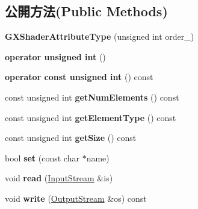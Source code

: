 \subsection*{公開方法(Public Methods)}
\begin{DoxyCompactItemize}
\item 
{\bfseries G\+X\+Shader\+Attribute\+Type} (unsigned int order\+\_)\hypertarget{class_magnum_1_1_g_x_shader_attribute_type_a07b589f091a5e39983f686599959d6cb}{}\label{class_magnum_1_1_g_x_shader_attribute_type_a07b589f091a5e39983f686599959d6cb}

\item 
{\bfseries operator unsigned int} ()\hypertarget{class_magnum_1_1_g_x_shader_attribute_type_a21c1ab8a9d49552ac5db1a88601b0b59}{}\label{class_magnum_1_1_g_x_shader_attribute_type_a21c1ab8a9d49552ac5db1a88601b0b59}

\item 
{\bfseries operator const unsigned int} () const \hypertarget{class_magnum_1_1_g_x_shader_attribute_type_ad83dcfebf8edd2309ec3e51952dd245d}{}\label{class_magnum_1_1_g_x_shader_attribute_type_ad83dcfebf8edd2309ec3e51952dd245d}

\item 
const unsigned int {\bfseries get\+Num\+Elements} () const \hypertarget{class_magnum_1_1_g_x_shader_attribute_type_a10aded35ad0325b44d2d427f7ce3114d}{}\label{class_magnum_1_1_g_x_shader_attribute_type_a10aded35ad0325b44d2d427f7ce3114d}

\item 
const unsigned int {\bfseries get\+Element\+Type} () const \hypertarget{class_magnum_1_1_g_x_shader_attribute_type_a65f3737a720d908ca3f4abb157d39073}{}\label{class_magnum_1_1_g_x_shader_attribute_type_a65f3737a720d908ca3f4abb157d39073}

\item 
const unsigned int {\bfseries get\+Size} () const \hypertarget{class_magnum_1_1_g_x_shader_attribute_type_a040a1a10c5d3a02159a0f87ecc119cca}{}\label{class_magnum_1_1_g_x_shader_attribute_type_a040a1a10c5d3a02159a0f87ecc119cca}

\item 
bool {\bfseries set} (const char $\ast$name)\hypertarget{class_magnum_1_1_g_x_shader_attribute_type_a0de04de2499ce4851a6a0bd77da0949b}{}\label{class_magnum_1_1_g_x_shader_attribute_type_a0de04de2499ce4851a6a0bd77da0949b}

\item 
void {\bfseries read} (\hyperlink{class_magnum_1_1_input_stream}{Input\+Stream} \&is)\hypertarget{class_magnum_1_1_g_x_shader_attribute_type_a465e804a1249b3214c7e778b7788741a}{}\label{class_magnum_1_1_g_x_shader_attribute_type_a465e804a1249b3214c7e778b7788741a}

\item 
void {\bfseries write} (\hyperlink{class_magnum_1_1_output_stream}{Output\+Stream} \&os) const \hypertarget{class_magnum_1_1_g_x_shader_attribute_type_aca0cd92c43345b9e8f14ba262dd2b4df}{}\label{class_magnum_1_1_g_x_shader_attribute_type_aca0cd92c43345b9e8f14ba262dd2b4df}

\end{DoxyCompactItemize}
